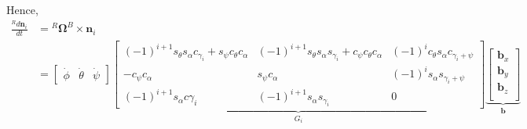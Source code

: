 Hence,
\begin{align*}
    \frac{{}^R d\pmb n_i}{dt} &= {}^R \pmb \Omega^B \times \pmb n_i\\
    &= \begin{bmatrix}
        \dot \phi & \dot \theta & \dot \psi
    \end{bmatrix}
    \underbrace{\begin{bmatrix}
        (-1)^{i+1} s_{\theta} s_{\alpha} c_{\gamma_i} + s_{\psi} c_{\theta} c_{\alpha}
        & (-1)^{i+1} s_{\theta} s_{\alpha} s_{\gamma_i} + c_{\psi} c_{\theta} c_{\alpha}
        & (-1)^{i} c_{\theta}s_{\alpha} c_{\gamma_i + \psi}
        \\
        -c_{\psi} c_{\alpha}
        & s_{\psi} c_{\alpha}
        & (-1)^{i} s_{\alpha} s_{\gamma_i + \psi}
        \\
        (-1)^{i+1} s_{\alpha} c{\gamma_i}
        & (-1)^{i+1} s_{\alpha} s_{\gamma_i}
        & 0
    \end{bmatrix}}_{G_i}
    \underbrace{\begin{bmatrix}
    \pmb b_x \\ \pmb b_y \\ \pmb b_z\\
    \end{bmatrix}}_{\pmb b}
\end{align*}

